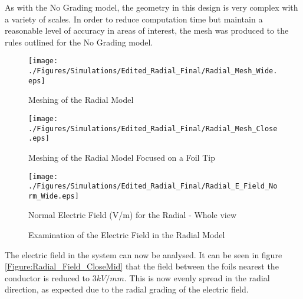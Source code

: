 As with the No Grading model, the geometry in this design is very complex with a variety of scales.
In order to reduce computation time but maintain a reasonable level of accuracy in areas of interest, the mesh was produced to the rules outlined for the No Grading model.
\begin{figure}[!h]
  \centering
    \texttt{[image: ./Figures/Simulations/Edited\_Radial\_Final/Radial\_Mesh\_Wide.eps]} 
	\caption{Meshing of the Radial Model}
	\label{Figure:Radial_Mesh_wide}
\end{figure}

\begin{figure}[!h]
  \centering
    \texttt{[image: ./Figures/Simulations/Edited\_Radial\_Final/Radial\_Mesh\_Close.eps]} 
	\caption{Meshing of the Radial Model Focused on a Foil Tip}
	\label{Figure:Radial_Mesh_close}
\end{figure}


\begin{figure}[!h]
  \centering
    \texttt{[image: ./Figures/Simulations/Edited\_Radial\_Final/Radial\_E\_Field\_Norm\_Wide.eps]} 
	\caption{Normal Electric Field (V/m) for the Radial - Whole view}
	\label{Figure:Radial_Field_Wide}
   \end{figure}

\begin{figure}[!h]
  \centering
{} 
\caption{Examination of the Electric Field in the Radial Model}
\label{Figure:No_Grading_Field}
\end{figure}

The electric field in the system can now be analysed.
It can be seen in figure \ref{Figure:Radial_Field_CloseMid} that the field between the foils nearest the conductor is reduced to $3kV/mm$.
This is now evenly spread in the radial direction, as expected due to the radial grading of the electric field.

